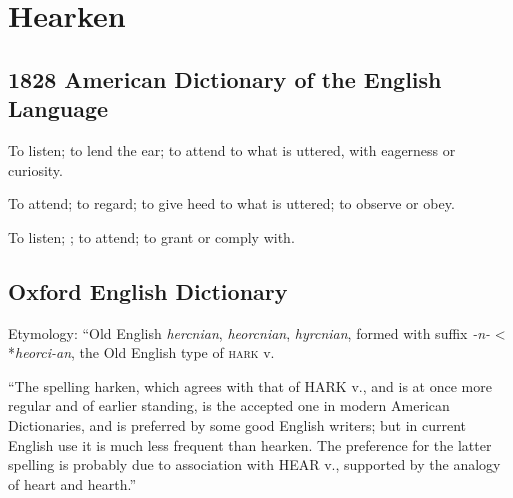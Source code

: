 \section{Hearken}
	\label{HEARKEN}
	

\subsection{1828 American Dictionary of the English Language} %
	\label{HEARKEN-1828}

	\begin{compactitem}
		\item[1] To listen; to lend the ear; to attend to what is uttered, with eagerness or curiosity.
		\item[2] To attend; to regard; to give heed to what is uttered; to observe or obey.
		\item[3] To listen; ; to attend; to grant or comply with.
	\end{compactitem}

\subsection{Oxford English Dictionary} %
	\label{HEARKEN-OED}
	
	Etymology: ``Old English \textit{hercnian}, \textit{heorcnian}, \textit{hyrcnian}, formed with suffix \textit{-n-} < *\textit{heorci-an}, the Old English type of \textsc{hark} v.
	
	``The spelling harken, which agrees with that of \textsc{HARK} v., and is at once more regular and of earlier standing, is the accepted one in modern American Dictionaries, and is preferred by some good English writers; but in current English use it is much less frequent than hearken. The preference for the latter spelling is probably due to association with \textsc{HEAR} v., supported by the analogy of heart and hearth.''

